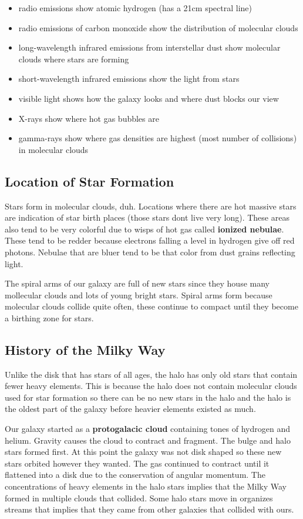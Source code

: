 \documentclass[12pt]{article}
\begin{document}
\begin{itemize}
\item radio emissions show atomic hydrogen (has a 21cm spectral line)
\item radio emissions of carbon monoxide show the distribution of molecular clouds
\item long-wavelength infrared emissions from interstellar dust show molecular clouds where stars are forming
\item short-wavelength infrared emissions show the light from stars
\item visible light shows how the galaxy looks and where dust blocks our view
\item X-rays show where hot gas bubbles are
\item gamma-rays show where gas densities are highest (most number of collisions) in molecular clouds
\end{itemize}

\subsection{Location of Star Formation}
Stars form in molecular clouds, duh. Locations where there are hot massive stars are indication of star birth places (those stars dont live very long). These areas also tend to be very colorful due to wisps of hot gas called \textbf{ionized nebulae}. These tend to be redder because electrons falling a level in hydrogen give off red photons. Nebulae that are bluer tend to be that color from dust grains reflecting light.

The spiral arms of our galaxy are full of new stars since they house many mollecular clouds and lots of young bright stars. Spiral arms form because molecular clouds collide quite often, these continue to compact until they become a birthing zone for stars.

\subsection{History of the Milky Way}
Unlike the disk that has stars of all ages, the halo has only old stars that contain fewer heavy elements. This is because the halo does not contain molecular clouds used for star formation so there can be no new stars in the halo and the halo is the oldest part of the galaxy before heavier elements existed as much.

Our galaxy started as a \textbf{protogalacic cloud} containing tones of hydrogen and helium. Gravity causes the cloud to contract and fragment. The bulge and halo stars formed first. At this point the galaxy was not disk shaped so these new stars orbited however they wanted. The gas continued to contract until it flattened into a disk due to the conservation of angular momentum. The concentrations of heavy elements in the halo stars implies that the Milky Way formed in multiple clouds that collided. Some halo stars move in organizes streams that implies that they came from other galaxies that collided with ours.
\end{document}
